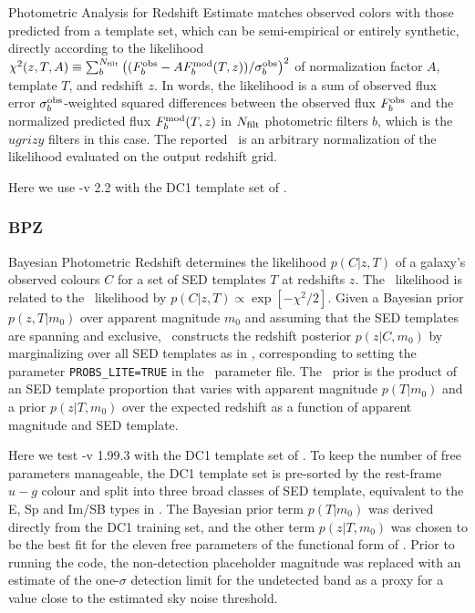 Photometric Analysis for Redshift Estimate \citep[\lephare\footnote{\url{http://www.cfht.hawaii.edu/~arnouts/lephare.html}},][]{Arnouts:99,Ilbert:06} matches observed colors with those predicted from a template set, which can be semi-empirical or entirely synthetic, directly according to the likelihood $\chi^{2}(z, T, A) \equiv \sum_{b}^{N_{\rm{filt}}} \left((F^{\rm{obs}}_{b} - A F^{\rm{mod}}_{b}(T, z)) / \sigma^{\rm{obs}}_{b}\right)^{2}$ of normalization factor $A$, template $T$, and redshift $z$.
In words, the likelihood is a sum of observed flux error $\sigma_{b}^{\rm{obs}}$-weighted squared differences between the observed flux $F^{\rm{obs}}_{b}$ and the normalized predicted flux $F^{\rm{mod}}_{b}(T, z)$ in $N_{\rm{filt}}$ photometric filters $b$, which is the \lsst\ $ugrizy$ filters in this case.
The reported \pzpdf\ is an arbitrary normalization of the likelihood evaluated on the output redshift grid.

Here we use \lephare-v 2.2 with the DC1 template set of .

\subsubsection{BPZ}

Bayesian Photometric Redshift \citep[\bpz\footnote{\url{http://www.stsci.edu/~dcoe/BPZ/}},][]{Benitez:00} determines the likelihood $p(C \vert z, T)$ of a galaxy's observed colours $C$ for a set of SED templates $T$ at redshifts $z$.
The \bpz\ likelihood is related to the \chisq\ likelihood by $p(C \vert z, T) \propto \exp[- \chi^{2} / 2]$.
Given a Bayesian prior $p(z, T \vert m_{0})$ over apparent magnitude $m_0$ and assuming that the SED templates are spanning and exclusive, \bpz\ constructs the redshift posterior $p(z \vert C, m_0)$ by marginalizing over all SED templates as in \citep[Eq.~3 from][]{Benitez:00}, corresponding to setting the parameter \texttt{PROBS\_LITE=TRUE} in the \bpz\ parameter file.
The \bpz\ prior is the product of an SED template proportion that varies with apparent magnitude $p(T \vert m_{0})$ and a prior $p(z \vert T, m_{0})$ over the expected redshift as a function of apparent magnitude and SED template.

Here we test \bpz-v 1.99.3 with the DC1 template set of .
To keep the number of free parameters manageable, the DC1 template set is pre-sorted by the rest-frame $u-g$ colour and split into three broad classes of SED template, equivalent to the E, Sp and Im/SB types in .
The Bayesian prior term $p(T \vert m_{0})$ was derived directly from the DC1 training set, and the other term $p(z \vert T, m_{0})$ was chosen to be the best fit for the eleven free parameters of the functional form of \citet{Benitez:00}.
Prior to running the code, the non-detection placeholder magnitude was replaced with an estimate of the one-$\sigma$ detection limit for the undetected band as a proxy for a value close to the estimated sky noise threshold.

